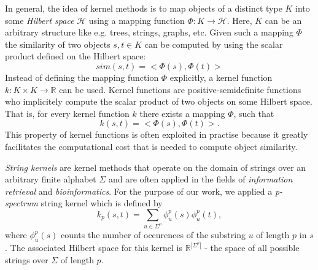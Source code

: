 In general, the idea of kernel methods is to map objects of a
distinct type $K$ into some \textit{Hilbert space} $\mathcal{H}$ using a mapping function $\Phi :
K \rightarrow \mathcal{H}$. Here, $K$ can be an arbitrary structure like e.g. trees, strings,
graphs, etc. Given such a mapping $\Phi$ the similarity of two objects $s,t \in K$ can be computed
by using the scalar product defined on the Hilbert space:
\[sim(s,t) = <\Phi(s),\Phi(t)>\]
Instead of defining the mapping function $\Phi$ explicitly, a kernel function $k : K \times K
\rightarrow \mathbb{R}$ can be used. Kernel functions are positive-semidefinite functions
who implicitely compute the scalar product of two objects on some Hilbert space. That is, for every
kernel function $k$ there exists a mapping $\Phi$, such that
\[k(s,t) = <\Phi(s),\Phi(t)>.\]
This property of kernel functions is often exploited in practise because it greatly facilitates the
computational cost that is needed to compute object similarity.

\textit{String kernels} are kernel methods  that operate on the domain of strings over
an arbitrary finite alphabet $\Sigma$ and are often applied in the fields of \textit{information
retrieval} and \textit{bioinformatics}. For the purpose of our work, we applied a
\textit{p-spectrum} string kernel  which is defined by
\[k_p(s,t) = \sum_{u \in \Sigma^p}{\phi_u^p(s)\phi_u^p(t)},\]
where $\phi_u^p(s)$ counts the number of occurences of the substring $u$ of length $p$ in $s$. The
associated Hilbert space for this kernel is $\mathbb{R}^{|\Sigma^p|}$ - the space of all possible
strings over $\Sigma$ of length $p$.



